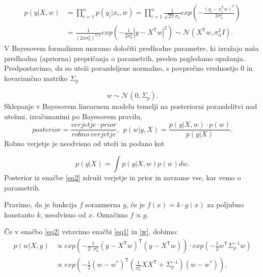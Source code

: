 \documentclass[12pt,a4paper]{amsart}
\theoremstyle{definition} %
\theoremstyle{plain} %
\begin{document}
\begin{equation} \label{eq1}
\begin{split}
 p( y | X, w) &= \prod\limits_{i=1}^{n} p(y_{i} | x_{i}, w) = \prod\limits_{i=1}^{n} \frac{1}{\sqrt{2\pi} \sigma_{n}} exp(-\frac{ (y_{i}- x_{i}^\mathsf{T} w)^2}{2 \sigma_{n}^2})  \\
 &=\frac{1}{ (2\pi \sigma_{n}^2 )^{n/2}} exp( - \frac{1}{2\sigma_{n}^2}|y - X^\mathsf{T} w |^2)  
 \sim \mathcal{N}( X^\mathsf{T} w, \sigma_{n}^2 I).
\end{split}
\end{equation}
V Bayesovem formalizmu moramo določiti predhodne parametre, ki izražajo naša predhodna (apriorna) prepričanja o parametrih, preden pogledamo opažanja.
Predpostavimo, da so uteži porazdeljene normalno, s povprečno vrednostjo 0 in kovariančno matriko $\Sigma_{p}$

\begin{equation} \label{w}
w \sim \mathcal{N}(0, \Sigma_{p}).
\end{equation}
Sklepanje v Bayesovem linearnem modelu temelji na posteriorni porazdelitvi nad utežmi, izračunanimi po Bayesovem pravilu,
\begin{equation} \label{eq2}
posterior = \frac{verjetje \cdot prior}{robno~verjetje},   ~~  p(w|y,X) = \frac{p(y|X,w) \cdot p(w)}{p(y|X)}.
\end{equation} 
Robno verjetje je neodvisno od uteži in podano kot

\begin{equation}
p(y|X) = \int p(y|X,w) p(w) dw.
\end{equation}
Posterior iz enačbe \ref{eq2} združi verjetje in prior in zavzame vse, kar vemo o parametrih. 

 Pravimo, da je funkcija $f$ sorazmerna $g$, če je $f(x)=k \cdot g(x)$ za poljubno konstanto $k$, neodvisno od $x$. Označimo $ f \propto g$.

Če v enačbo \ref{eq2} vstavimo enačbi \ref{eq1} in \ref{w}, dobimo:
\begin{equation}
\begin{split}
p(w| X,y) & \propto exp ( - \frac{1}{2 \cdot \sigma_{n}^2}( y- X^\mathsf{T} w)^\mathsf{T} (y - X^\mathsf{T} w)) \cdot exp(- \frac{1}{2} w^\mathsf{T} \Sigma_{p}^{-1}w) \\
& \propto exp (- \frac{1}{2}(w - w^*)^\mathsf{T} (\frac{1}{ \sigma_{n}^2} X X^\mathsf{T} + \Sigma_{p}^{-1}) (w-w^*)),
\end{split}
\end{equation}
\end{document}
